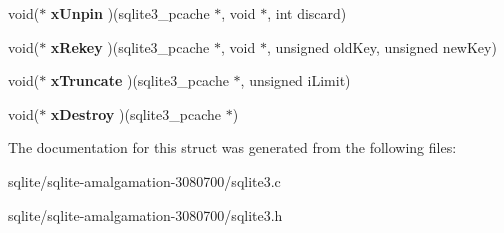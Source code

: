 \begin{DoxyCompactItemize}
\item 
\hypertarget{structsqlite3__pcache__methods_ade2ab50cc6896be03ee86541877fa85e}{void($\ast$ {\bfseries x\+Unpin} )(sqlite3\+\_\+pcache $\ast$, void $\ast$, int discard)}\label{structsqlite3__pcache__methods_ade2ab50cc6896be03ee86541877fa85e}

\item 
\hypertarget{structsqlite3__pcache__methods_adc5552190f1de86eb95d91e9cf8430e6}{void($\ast$ {\bfseries x\+Rekey} )(sqlite3\+\_\+pcache $\ast$, void $\ast$, unsigned old\+Key, unsigned new\+Key)}\label{structsqlite3__pcache__methods_adc5552190f1de86eb95d91e9cf8430e6}

\item 
\hypertarget{structsqlite3__pcache__methods_aad73f9335999770bcd2dc6a2d914b4f0}{void($\ast$ {\bfseries x\+Truncate} )(sqlite3\+\_\+pcache $\ast$, unsigned i\+Limit)}\label{structsqlite3__pcache__methods_aad73f9335999770bcd2dc6a2d914b4f0}

\item 
\hypertarget{structsqlite3__pcache__methods_aac18fc581d8d63550a6657016c24ba5d}{void($\ast$ {\bfseries x\+Destroy} )(sqlite3\+\_\+pcache $\ast$)}\label{structsqlite3__pcache__methods_aac18fc581d8d63550a6657016c24ba5d}

\end{DoxyCompactItemize}


The documentation for this struct was generated from the following files\+:\begin{DoxyCompactItemize}
\item 
sqlite/sqlite-\/amalgamation-\/3080700/sqlite3.\+c\item 
sqlite/sqlite-\/amalgamation-\/3080700/sqlite3.\+h\end{DoxyCompactItemize}
